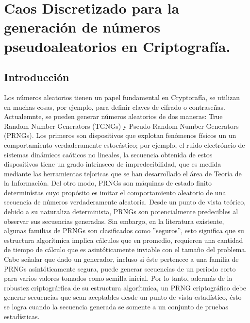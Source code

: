 \chapter{Caos Discretizado para la generación de números pseudoaleatorios en Criptografía.}
\section{Introducción}

Los números aleatorios tienen un papel fundamental en Cryptorafía, se utilizan en muchas cosas, por ejemplo, para definir claves de cifrado o contraseñas. Actualemnte, se pueden generar números aleatorios de dos maneras: True Random Number Generators (TGNGs) y Pseudo Random Number Generators (PRNGs). Los primeros son dispositivos que explotan fenómenos físicos un un comportamiento verdaderamente estocástico; por ejemplo, el ruido electróncio de sistemas dinámicos caóticos no lineales, la secuencia obtenida de estos dispositivos tiene un grado intrínseco de impredecibilidad, que es medida mediante las herramientas te[oricas que se han desarrollado el área de Teoría de la Información. Del otro modo, PRNGs son máquinas de estado finito determinístas cuyo propósito es imitar el comportamiento aleatorio  de una secuencia de números verdaderamente aleatoria. Desde un punto de vista teórico, debido a su naturaliza determinista, PRNGs son potencialmente predecibles al observar sus secuencias generadas. Sin embargo, en la literatura existente, algunas familias de PRNGs son clasificados como ''seguros'', esto significa que su estructura algorítmica implica cálculos que en promedio, requieren una cantidad de tiempo de cálculo que es asintóticamente inviable con el tamaño del problema. Cabe señalar que dado un generador, incluso si éste pertenece a una familia  de 	PRNGs asintóticamente segura, puede generar secuencias de un periodo corto para varios valores tomados como semilla inicial. Por lo tanto, adermás de la robustez criptográrfica de su estructura algorítmica, un PRNG criptográfico debe generar secuencias que sean aceptables desde un punto de vista estadístico, ésto se logra cuando la secuencia generada se somente a un conjunto de pruebas estadísticas.

